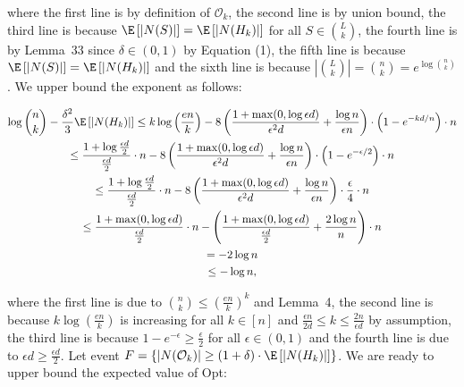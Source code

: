 \documentclass[10pt,a4paper]{article}
\begin{document}
where the first line is by definition of $\mathcal{O}_{k}$, the second line is by union bound, the third line is because $\E\left[|N(S)|\right]=\E\left[|N(H_{k})|\right]$ for all $S\in\binom{L}{k}$, the fourth line is by Lemma 33 since $\delta\in(0,1)$ by Equation (1), the fifth line is because $\E\left[|N(S)|\right]=\E\left[|N(H_{k})|\right]$ and the sixth line is because $|\binom{L}{k}|=\binom{n}{k}=e^{\log{\binom{n}{k}}}$.
We upper bound the exponent as follows:\par


\[\begin{gathered}
\displaystyle\log{\binom{n}{k}}-\frac{\delta^{2}}{3}\E\left[|N(H_{k})|\right] \displaystyle\leq k\log\left(\frac{en}{k}\right)-8\left(\frac{1+\max(0,\log{\epsilon d})}{\epsilon^{2}d}+\frac{\log{n}}{\epsilon n}\right)\cdot\left(1-e^{-kd/n}\right)\cdot n \\
\displaystyle\leq\frac{1+\log{\frac{\epsilon d}{2}}}{\frac{\epsilon d}{2}}\cdot n-8\left(\frac{1+\max(0,\log{\epsilon d})}{\epsilon^{2}d}+\frac{\log{n}}{\epsilon n}\right)\cdot\left(1-e^{-\epsilon/2}\right)\cdot n \\
\displaystyle\leq\frac{1+\log{\frac{\epsilon d}{2}}}{\frac{\epsilon d}{2}}\cdot n-8\left(\frac{1+\max(0,\log{\epsilon d})}{\epsilon^{2}d}+\frac{\log{n}}{\epsilon n}\right)\cdot\frac{\epsilon}{4}\cdot n \\
\displaystyle\leq\frac{1+\max(0,\log{\epsilon d})}{\frac{\epsilon d}{2}}\cdot n-\left(\frac{1+\max(0,\log{\epsilon d})}{\frac{\epsilon d}{2}}+\frac{2\log{n}}{n}\right)\cdot n \\
\displaystyle=-2\log{n} \\
\displaystyle\leq-\log{n},
\end{gathered}\]


where the first line is due to $\binom{n}{k}\leq\left(\frac{en}{k}\right)^{k}$ and Lemma 4, the second line is because $k\log\left(\frac{en}{k}\right)$ is increasing for all $k\in[n]$ and $\frac{\epsilon n}{2d}\leq k\leq\frac{2n}{\epsilon d}$ by assumption, the third line is because $1-e^{-\epsilon}\geq\frac{\epsilon}{2}$ for all $\epsilon\in(0,1)$ and the fourth line is due to $\epsilon d\geq\frac{\epsilon d}{2}$.
Let event $F=\{|N(\mathcal{O}_{k})|\geq(1+\delta)\cdot\E\left[|N(H_{k})|\right]\}$.
We are ready to upper bound the expected value of Opt:\par
\end{document}
